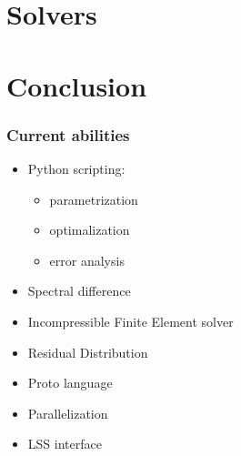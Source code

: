 \documentclass{beamer}
\begin{document}
\section{Solvers}




\section{Conclusion}

\begin{frame}
 \frametitle{Current abilities}
\begin{itemize}
 \item Python scripting: 
  \begin{itemize}
   \item parametrization
   \item optimalization
   \item error analysis
  \end{itemize}
 \item Spectral difference
 \item Incompressible Finite Element solver
 \item Residual Distribution
 \item Proto language
 \item Parallelization
 \item LSS interface
\end{itemize}
\end{frame}
\end{document}
